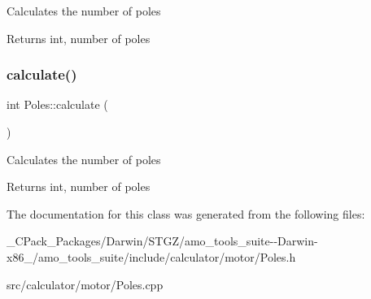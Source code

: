 Calculates the number of poles

\begin{DoxyReturn}{Returns}
int, number of poles 
\end{DoxyReturn}
\mbox{\label{class_poles_a23988f68100374c8277dca81ab06f724}} 
\subsubsection{\texorpdfstring{calculate()}{calculate()}\hspace{0.1cm}{\footnotesize\ttfamily [3/3]}}
{\footnotesize\ttfamily int Poles\+::calculate (\begin{DoxyParamCaption}{ }\end{DoxyParamCaption})}

Calculates the number of poles

\begin{DoxyReturn}{Returns}
int, number of poles 
\end{DoxyReturn}


The documentation for this class was generated from the following files\+:\begin{DoxyCompactItemize}
\item 
\+\_\+\+C\+Pack\+\_\+\+Packages/\+Darwin/\+S\+T\+G\+Z/amo\+\_\+tools\+\_\+suite-\/-\/\+Darwin-\/x86\+\_/amo\+\_\+tools\+\_\+suite/include/calculator/motor/Poles.\+h\item 
src/calculator/motor/Poles.\+cpp\end{DoxyCompactItemize}
